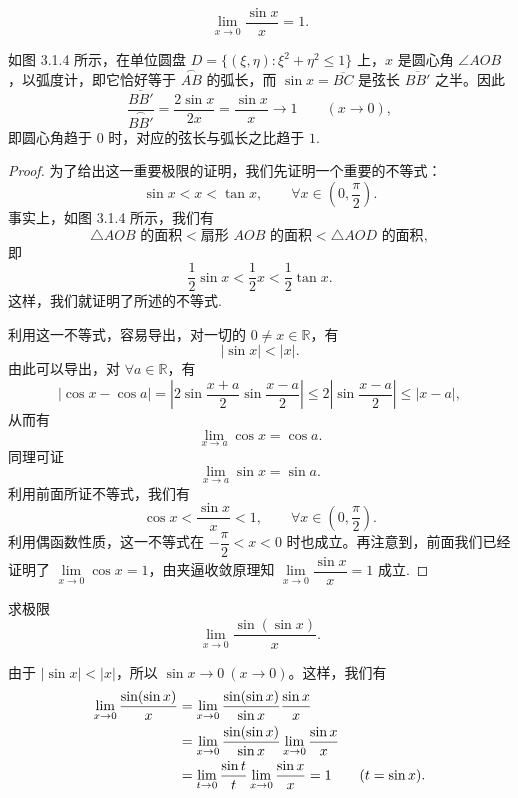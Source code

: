\begin{theorem}[{第一个重要极限}]\label{theorem:ma-3-source-49}
\[
  \lim_{x\to0}\frac{\sin x}{x}=1.
\]
\end{theorem}


\begin{analyze}
如图 3.1.4 所示，在单位圆盘 $D=\{(\xi,\eta):\xi^2+\eta^2\leqslant1\}$ 上，$x$ 是圆心角 $\angle AOB$，以弧度计，即它恰好等于 $\overset{\frown}{AB}$ 的弧长，而 $\sin x=\overline{BC}$ 是弦长 $\overline{BB'}$ 之半。因此
\[
  \frac{\overline{BB'}}{\overset{\frown}{BB'}}
  =\frac{2\sin x}{2x}=\frac{\sin x}{x}\to1\qquad (x\to0),
\]
即圆心角趋于 $0$ 时，对应的弦长与弧长之比趋于 $1$.
\end{analyze}


\begin{proof}
为了给出这一重要极限的证明，我们先证明一个重要的不等式：
\[
  \sin x<x<\tan x,\qquad \forall x\in\left(0,\frac{\pi}{2}\right).
\]
事实上，如图 3.1.4 所示，我们有
\[
  \triangle AOB\text{ 的面积}<\text{扇形 }AOB\text{ 的面积}<\triangle AOD\text{ 的面积},
\]
即
\[
  \frac12\sin x<\frac12x<\frac12\tan x.
\]
这样，我们就证明了所述的不等式.

利用这一不等式，容易导出，对一切的 $0\ne x\in\mathbb{R}$，有
\[
  |\sin x|<|x|.
\]
由此可以导出，对 $\forall a\in\mathbb{R}$，有
\[
  |\cos x-\cos a|
  =\left|2\sin\frac{x+a}{2}\sin\frac{x-a}{2}\right|
  \leqslant 2\left|\sin\frac{x-a}{2}\right|\leqslant |x-a|,
\]
从而有
\[
  \lim_{x\to a}\cos x=\cos a.
\]
同理可证
\[
  \lim_{x\to a}\sin x=\sin a.
\]
利用前面所证不等式，我们有
\[
  \cos x<\frac{\sin x}{x}<1,\qquad \forall x\in\left(0,\frac{\pi}{2}\right).
\]
利用偶函数性质，这一不等式在 $-\dfrac{\pi}{2}<x<0$ 时也成立。再注意到，前面我们已经证明了 $\lim\limits_{x\to0}\cos x=1$，由夹逼收敛原理知 $\lim\limits_{x\to0}\dfrac{\sin x}{x}=1$ 成立.
\end{proof}


\begin{example}\label{example:ma-3-1-14}
求极限
\[
  \lim_{x\to0}\frac{\sin(\sin x)}{x}.
\]
\end{example}


\begin{solve}
由于 $|\sin x|<|x|$，所以 $\sin x\to0\ (x\to0)$。这样，我们有
\[
\begin{aligned}
  \lim_{x\to0}\frac{\sin(\sin x)}{x}
  &=\lim_{x\to0}\frac{\sin(\sin x)}{\sin x}\frac{\sin x}{x}\\
  &=\lim_{x\to0}\frac{\sin(\sin x)}{\sin x}\lim_{x\to0}\frac{\sin x}{x}\\
  &=\lim_{t\to0}\frac{\sin t}{t}\lim_{x\to0}\frac{\sin x}{x}=1\qquad (t=\sin x).
\end{aligned}
\qedhere
\]
\end{solve}


